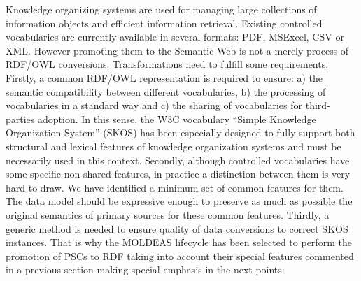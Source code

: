 Knowledge organizing systems are used for managing large collections of information objects and efficient information retrieval. 
Existing controlled vocabularies are currently available in several formats: PDF, MSExcel, CSV or XML. However promoting them 
to the Semantic Web is not a merely process of RDF/OWL conversions. Transformations need to fulfill some requirements. Firstly, 
a common RDF/OWL representation is required to ensure: a) the semantic compatibility between different vocabularies,
b) the processing of vocabularies in a standard way and c) the sharing of vocabularies for third-parties adoption. In this sense, 
the W3C vocabulary ``Simple Knowledge Organization System'' (SKOS) has been especially designed to fully support 
both structural and lexical features of knowledge organization systems and must be necessarily used in this context. 
Secondly, although controlled vocabularies have some specific non-shared features, in practice a distinction between them is very hard to draw. 
We have identified a minimum set of common features for them. The data model should be expressive enough to preserve as much as 
possible the original semantics of primary sources for these common features. Thirdly, a generic method is needed to ensure quality 
of data conversions to correct SKOS instances. That is why the MOLDEAS lifecycle has been selected to perform the promotion 
of PSCs to RDF taking into account their special features commented in a previous section making special emphasis in the next points:
